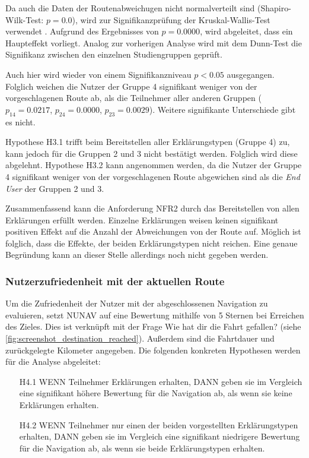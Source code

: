 Da auch die Daten der Routenabweichugen nicht normalverteilt sind (Shapiro-Wilk-Test: $ p = 0.0 $), wird zur Signifikanzprüfung der Kruskal-Wallis-Test verwendet \cite{wohlin2012experimentation}. Aufgrund des Ergebnisses von $ p = 0.0000 $, wird abgeleitet, dass ein Haupteffekt vorliegt. Analog zur vorherigen Analyse wird mit dem Dunn-Test die Signifikanz zwischen den einzelnen Studiengruppen geprüft. 

Auch hier wird wieder von einem Signifikanzniveau $ p < 0.05 $ ausgegangen. Folglich weichen die Nutzer der Gruppe 4 signifikant weniger von der vorgeschlagenen Route ab, als die Teilnehmer aller anderen Gruppen ($ p_{14} = 0.0217 $, $ p_{24} = 0.0000 $, $ p_{23} = 0.0029 $). Weitere signifikante Unterschiede gibt es nicht.

Hypothese H3.1 trifft beim Bereitstellen aller Erklärungstypen (Gruppe 4) zu, kann jedoch für die Gruppen 2 und 3 nicht bestätigt werden. Folglich wird diese abgelehnt. Hypothese H3.2 kann angenommen werden, da die Nutzer der Gruppe 4 signifikant weniger von der vorgeschlagenen Route abgewichen sind als die \textit{End User} der Gruppen 2 und 3.

Zusammenfassend kann die Anforderung NFR2 durch das Bereitstellen von allen Erklärungen erfüllt werden. Einzelne Erklärungen weisen keinen signifikant positiven Effekt auf die Anzahl der Abweichungen von der Route auf. Möglich ist folglich, dass die Effekte, der beiden Erklärungstypen nicht reichen. Eine genaue Begründung kann an dieser Stelle allerdings noch nicht gegeben werden.

\subsubsection{Nutzerzufriedenheit mit der aktuellen Route}

Um die Zufriedenheit der Nutzer mit der abgeschlossenen Navigation zu evaluieren, setzt NUNAV auf eine Bewertung mithilfe von 5 Sternen bei Erreichen des Zieles. Dies ist verknüpft mit der Frage \glqq Wie hat dir die Fahrt gefallen?\grqq{} (siehe \autoref{fig:screenshot_destination_reached}). Außerdem sind die Fahrtdauer und zurückgelegte Kilometer angegeben. Die folgenden konkreten Hypothesen werden für die Analyse abgeleitet:

\begin{enumerate}
    \item[H4.1] WENN Teilnehmer Erklärungen erhalten, DANN geben sie im Vergleich eine signifikant höhere Bewertung für die Navigation ab, als wenn sie keine Erklärungen erhalten.
    \item[H4.2] WENN Teilnehmer nur einen der beiden vorgestellten Erklärungstypen erhalten, DANN geben sie im Vergleich eine signifikant niedrigere Bewertung für die Navigation ab, als wenn sie beide Erklärungstypen erhalten.
\end{enumerate}

